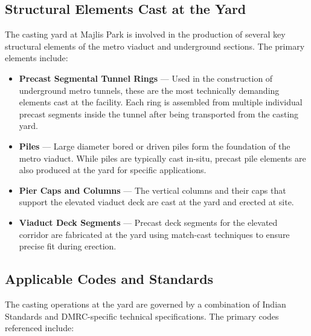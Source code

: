 \subsection{Structural Elements Cast at the Yard}
\par\noindent
The casting yard at Majlis Park is involved in the production of several key structural elements of the metro viaduct and underground sections. The primary elements include:

\begin{itemize}
    \item \textbf{Precast Segmental Tunnel Rings} --- Used in the construction of underground metro tunnels, these are the most technically demanding elements cast at the facility. Each ring is assembled from multiple individual precast segments inside the tunnel after being transported from the casting yard.
    \item \textbf{Piles} --- Large diameter bored or driven piles form the foundation of the metro viaduct. While piles are typically cast in-situ, precast pile elements are also produced at the yard for specific applications.
    \item \textbf{Pier Caps and Columns} --- The vertical columns and their caps that support the elevated viaduct deck are cast at the yard and erected at site.
    \item \textbf{Viaduct Deck Segments} --- Precast deck segments for the elevated corridor are fabricated at the yard using match-cast techniques to ensure precise fit during erection.
\end{itemize}

\subsection{Applicable Codes and Standards}
\par\noindent
The casting operations at the yard are governed by a combination of Indian Standards and DMRC-specific technical specifications. The primary codes referenced include:

